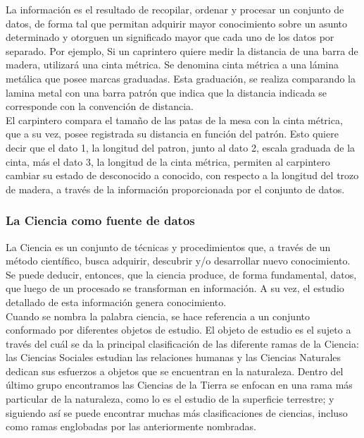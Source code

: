 La información es el resultado de recopilar, ordenar y procesar un conjunto de datos, de forma tal que permitan adquirir mayor conocimiento sobre un asunto determinado y otorguen un significado mayor que cada uno de los datos por separado. Por ejemplo, Si un caprintero quiere medir la distancia de una barra de madera, utilizará una cinta métrica. Se denomina cinta métrica a una lámina metálica que posee marcas graduadas. Esta graduación, se realiza comparando la lamina metal con una barra patrón que indica que la distancia indicada se corresponde con la convención de distancia.\\

El carpintero compara el tamaño de las patas de la mesa con la cinta métrica, que a su vez, posee registrada su distancia en función del patrón. Esto quiere decir que el dato 1, la longitud del patron, junto al dato 2, escala graduada de la cinta, más el dato 3, la longitud de la cinta métrica, permiten al carpintero cambiar su estado de desconocido a conocido, con respecto a la longitud del trozo de madera, a través de la información proporcionada por el conjunto de datos.\\

\subsubsection*{La Ciencia como fuente de datos}
La Ciencia es un conjunto de técnicas y procedimientos que, a través de un método científico, busca adquirir, descubrir y/o desarrollar nuevo conocimiento. Se puede deducir, entonces, que la ciencia produce, de forma fundamental, datos, que luego de un procesado se transforman en información. A su vez, el estudio detallado de esta información genera conocimiento.\\

Cuando se nombra la palabra ciencia, se hace referencia a un conjunto conformado por diferentes objetos de estudio. El objeto de estudio es el sujeto a través del cuál se da la principal clasificación de las diferente ramas de la Ciencia: las Ciencias Sociales estudian las relaciones humanas y las Ciencias Naturales dedican sus esfuerzos a objetos que se encuentran en la naturaleza. Dentro del último grupo encontramos las Ciencias de la Tierra se enfocan en una rama más particular de la naturaleza, como lo es el estudio de la superficie terrestre; y siguiendo así se puede encontrar muchas más clasificaciones de ciencias, incluso como ramas englobadas por las anteriormente nombradas.\\

